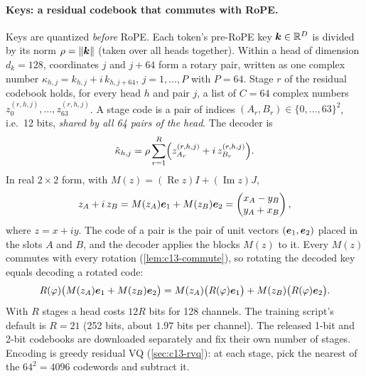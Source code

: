 \paragraph{Keys: a residual codebook that commutes with RoPE.} Keys are quantized \emph{before}
RoPE. Each token's pre-RoPE key $\bm{k}\in\mathbb{R}^D$ is divided by its norm $\rho=\left\lVert \bm{k}\right\rVert$ (taken over all
heads together). Within a head of dimension $d_k=128$, coordinates $j$ and $j+64$ form a rotary pair, written
as one complex number $\kappa_{h,j}=k_{h,j}+i\,k_{h,j+64}$, $j=1,\dots,P$ with $P=64$. Stage $r$ of the
residual codebook holds, for every head $h$ and pair $j$, a list of $C=64$ complex numbers
$z^{(r,h,j)}_0,\dots,z^{(r,h,j)}_{63}$. A stage code is a pair of indices $(A_r,B_r)\in\{0,\dots,63\}^2$,
i.e.\ 12 bits, \emph{shared by all 64 pairs of the head}. The decoder is
\begin{equation}\label{eq:c13-commvq-key}
  \hat{\kappa}_{h,j} = \rho\sum_{r=1}^{R}\Bigl(z^{(r,h,j)}_{A_r}+i\,z^{(r,h,j)}_{B_r}\Bigr).
\end{equation}
In real $2\times2$ form, with $M(z)=(\operatorname{Re}z)I+(\operatorname{Im}z)J$,
\[
  z_A+i\,z_B = M(z_A)\bm{e}_1+M(z_B)\bm{e}_2 = \begin{pmatrix}x_A-y_B\\ y_A+x_B\end{pmatrix},
\]
where $z=x+iy$. The code of a pair is the pair of unit vectors $(\bm{e}_1,\bm{e}_2)$ placed in the slots $A$
and $B$, and the decoder applies the blocks $M(z)$ to it. Every $M(z)$ commutes with every rotation
(\cref{lem:c13-commute}), so rotating the decoded key equals decoding a rotated code:
\begin{equation}\label{eq:c13-commvq-commute}
  R(\varphi)\bigl(M(z_A)\bm{e}_1+M(z_B)\bm{e}_2\bigr) = M(z_A)\bigl(R(\varphi)\bm{e}_1\bigr)+M(z_B)\bigl(R(\varphi)\bm{e}_2\bigr).
\end{equation}
With $R$ stages a head costs $12R$ bits for 128 channels. The training script's default is $R=21$
(252 bits, about $1.97$ bits per channel). The released 1-bit and 2-bit codebooks are downloaded
separately and fix their own number of stages. Encoding is greedy residual VQ (\cref{sec:c13-rvq}): at
each stage, pick the nearest of the $64^2=4096$ codewords and subtract it.

